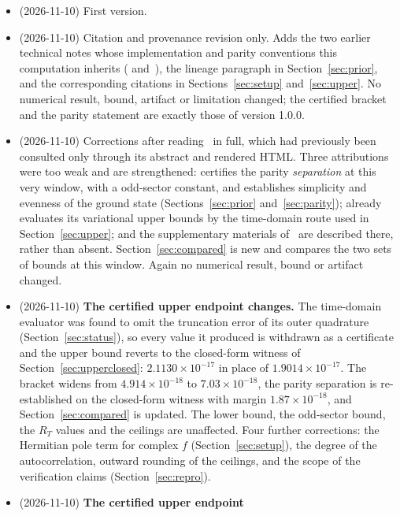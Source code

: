 \documentclass[11pt,a4paper]{article}
\theoremstyle{definition}
\theoremstyle{remark}
\begin{document}
\begin{itemize}
\item[\textbf{1.0.0}] (2026-11-10) First version.
\item[\textbf{1.0.1}] (2026-11-10) Citation and provenance revision only. Adds
  the two earlier technical notes whose implementation and parity conventions
  this computation inherits (\cite{Sensitivity} and~\cite{ParityNote}), the
  lineage paragraph in Section~\ref{sec:prior}, and the corresponding citations
  in Sections~\ref{sec:setup} and~\ref{sec:upper}. No numerical result, bound,
  artifact or limitation changed; the certified bracket and the parity
  statement are exactly those of version 1.0.0.
\item[\textbf{1.0.2}] (2026-11-10) Corrections after reading~\cite{Zhu} in full,
  which had previously been consulted only through its abstract and rendered
  HTML. Three attributions were too weak and are strengthened: \cite[Thm.~6.2]{Zhu}
  certifies the parity \emph{separation} at this very window, with a
  odd-sector constant, and establishes simplicity and evenness of the ground
  state (Sections~\ref{sec:prior} and~\ref{sec:parity});
  \cite[\S6.2]{Zhu} already evaluates its variational upper bounds by the
  time-domain route used in Section~\ref{sec:upper}; and the supplementary
  materials of~\cite[\S17]{Zhu} are described there, rather than absent.
  Section~\ref{sec:compared} is new and compares the two sets of bounds at this
  window. Again no numerical result, bound or artifact changed.
\item[\textbf{1.1.0}] (2026-11-10) \textbf{The certified upper endpoint
  changes.} The time-domain evaluator was found to omit the truncation error of
  its outer quadrature (Section~\ref{sec:status}), so every value it produced is
  withdrawn as a certificate and the upper bound reverts to the closed-form
  witness of Section~\ref{sec:upperclosed}: $2.1130\times10^{-17}$ in place of
  $1.9014\times10^{-17}$. The bracket widens from $4.914\times10^{-18}$ to
  $7.03\times10^{-18}$, the parity separation is re-established on the
  closed-form witness with margin $1.87\times10^{-18}$, and
  Section~\ref{sec:compared} is updated. The lower bound, the odd-sector bound,
  the $R_T$ values and the ceilings are unaffected. Four further corrections:
  the Hermitian pole term for complex $f$ (Section~\ref{sec:setup}), the degree
  of the autocorrelation, outward rounding of the ceilings, and the scope of the
  verification claims (Section~\ref{sec:repro}).
\item[\textbf{1.2.0}] (2026-11-10) \textbf{The certified upper endpoint
}
\end{itemize}
\end{document}
